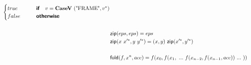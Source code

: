 \begin{align*}
\begin{cases}
    true
    &\quad\quad\premise{if}\quad v = \casev ~ (\text{"FRAME"}, \seq v) \\
    false &\quad\quad\premise{otherwise}\\
  \end{cases}
  \\
%
\newline \\
  &\zip(eps, eps) = eps \\
  &\zip(x ~ \seq{x'}, y ~ \seq{y'}) = (x, y) ~ \zip (\seq{x'}, \seq{y'}) \\
%
\newline \\
  &\fold(f, x^n, acc) = f(x_0, f(x_1, ~ ... ~ f(x_{n-2}, f(x_{n-1}, acc)) ~ ... ~ ))
\end{align*}





